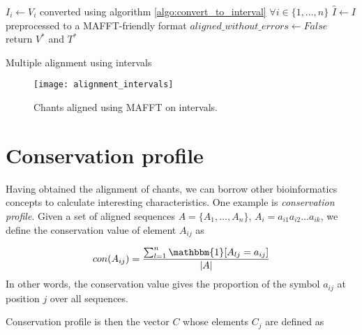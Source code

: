 \begin{algorithm}[H]
    \BlankLine
    $I_i \longleftarrow V_i$ converted using algorithm \ref{algo:convert_to_interval} $\forall i \in \{1,\dots, n\}$\;
    $\hat{I} \longleftarrow I$ preprocessed to a MAFFT-friendly format\;
    $aligned\_without\_errors \longleftarrow False$\;
    return $V^*$ and $T^*$\;
    \caption{Multiple alignment using intervals}
    \label{algo:align_intervals}
\end{algorithm}

\begin{figure}[h]
\centering
\texttt{[image: alignment\_intervals]}
\caption{Chants aligned using MAFFT on intervals.}
\label{fig:align_intervals}
\end{figure}

\section{Conservation profile}

Having obtained the alignment of chants, we can borrow other bioinformatics concepts to calculate interesting characteristics. One example is \emph{conservation profile}.
Given a set of aligned sequences $A = \{A_1,\dots,A_n\}$, $A_i = a_{i1}a_{i2}\dots a_{ik}$, we define the conservation value of element $A_{ij}$ as

\[
    con(A_{ij}) = \frac{\sum^n_{l=1} \mathbbm{1}[A_{lj} = a_{ij}]}{|A|}
\]
In other words, the conservation value gives the proportion of the symbol $a_{ij}$ at position $j$ over all sequences.

Conservation profile is then the vector $C$ whose elements $C_j$ are defined as

